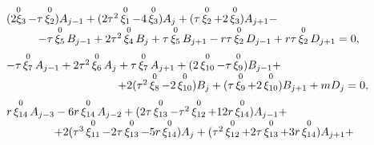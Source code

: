 \begin{equation}

\begin{array}{l}

(\mathop{2\xi_3}\limits^{0}-\tau\mathop{\xi_2}\limits^{0} ) A_{j-1}+

(2\tau^2\mathop{\xi_1}\limits^{0}-4\mathop{\xi_3}\limits^{0} )A_j+

(\tau\mathop{\xi_2}\limits^{0}+2\mathop{\xi_3}\limits^{0})A_{j+1}-

\\

\hspace{1cm}

-\tau\mathop{\xi_5}\limits^{0}B_{j-1}+2\tau^2\mathop{\xi_4}\limits^{0}B_j+

\tau\mathop{\xi_5}\limits^{0}B_{j+1}-r\tau\mathop{\xi_2}\limits^{0}D_{j-1}+

r\tau\mathop{\xi_2}\limits^{0}D_{j+1}=0,

\\[2mm]

-\tau\mathop{\xi_7}\limits^{0}A_{j-1}+2\tau^2\mathop{\xi_6}\limits^{0}A_j+

\tau\mathop{\xi_7}\limits^{0}A_{j+1}+

(2\mathop{\xi_{10}}\limits^{0}-\tau\mathop{\xi_9}\limits^{0})B_{j-1}+

\\

\hspace{3.5cm}

+2(\tau^2\mathop{\xi_8}\limits^{0}-2\mathop{\xi_{10}}\limits^{0})B_j+

(\tau\mathop{\xi_9}\limits^0+2\mathop{\xi_{10}}\limits^{0})B_{j+1}+m   D_j=0,

\\[2mm]

r\mathop{\xi_{14}}\limits^{0}A_{j-3}-

6r\mathop{\xi_{14}}\limits^{0}A_{j-2}+

(2\tau\mathop{\xi_{13}}\limits^{0}-\tau^2\mathop{\xi_{12}}\limits^{0}+12r\mathop{\xi_{14}}\limits^{0})A_{j-1}+

\\  

\hspace{1.5cm}

+2(\tau^3\mathop{\xi_{11}}\limits^{0}-2\tau\mathop{\xi_{13}}\limits^{0}-5r\mathop{\xi_{14}}\limits^{0})A_j+

(\tau^2\mathop{\xi_{12}}\limits^{0}+2\tau\mathop{\xi_{13}}\limits^{0}+3r\mathop{\xi_{14}}\limits^{0})A_{j+1}+


\end{array}
\end{equation}
